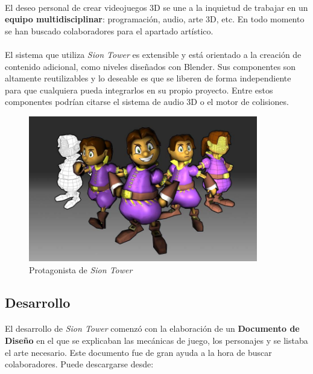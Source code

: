 \documentclass[16pt,spanish]{article}
\def \juego{\emph {Sion Tower} }
\begin{document}
\paragraph{}
El deseo personal de crear videojuegos 3D se une a la inquietud de trabajar
en un \textbf{equipo multidisciplinar}: programación, audio, arte 3D, etc. En todo
momento se han buscado colaboradores para el apartado artístico.

\paragraph{}
El sistema que utiliza \juego es extensible y está orientado a la creación
de contenido adicional, como niveles diseñados con Blender. Sus componentes
son altamente reutilizables y lo deseable es que se liberen de forma
independiente para que cualquiera pueda integrarlos en su propio proyecto.
Entre estos componentes podrían citarse el sistema de audio 3D o el motor
de colisiones.

\begin{figure}[H]
    \centering
        \includegraphics[width=10cm]{img/protagonista-siontower.jpg} 
    \caption{Protagonista de \juego}
    \label{img:protagonista-siontower}
\end{figure}


\subsection{Desarrollo}

\paragraph{}
El desarrollo de \juego comenzó con la elaboración de un \textbf{Documento
de Diseño} en el que se explicaban las mecánicas de juego, los personajes
y se listaba el arte necesario. Este documento fue de gran ayuda a la hora
de buscar colaboradores. Puede descargarse desde:
\end{document}
